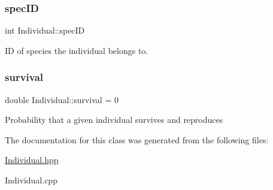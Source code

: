 \subsubsection{\texorpdfstring{spec\+ID}{specID}}
{\footnotesize\ttfamily int Individual\+::spec\+ID}

ID of species the individual belongs to. \hypertarget{classIndividual_adbd7cefa7cf5847a6a20e14c04ab20dd}{}\label{classIndividual_adbd7cefa7cf5847a6a20e14c04ab20dd} 
\subsubsection{\texorpdfstring{survival}{survival}}
{\footnotesize\ttfamily double Individual\+::survival = 0}

Probability that a given individual survives and reproduces 

The documentation for this class was generated from the following files\+:\begin{DoxyCompactItemize}
\item 
\hyperlink{Individual_8hpp}{Individual.\+hpp}\item 
Individual.\+cpp\end{DoxyCompactItemize}
